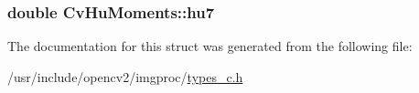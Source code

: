 \hypertarget{structCvHuMoments_ab50830c8592726d4b0d12b6a1d60e6cc}{
\subsubsection[{hu7}]{\setlength{\rightskip}{0pt plus 5cm}double Cv\-Hu\-Moments\-::hu7}}\label{structCvHuMoments_ab50830c8592726d4b0d12b6a1d60e6cc}


The documentation for this struct was generated from the following file\-:\begin{DoxyCompactItemize}
\item 
/usr/include/opencv2/imgproc/\hyperlink{imgproc_2types__c_8h}{types\-\_\-c.\-h}\end{DoxyCompactItemize}
